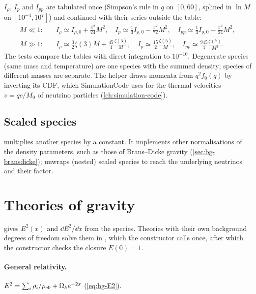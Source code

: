 \begin{implementation}
$I_\rho$, $I_p$ and $I_{pp}$ are tabulated once (Simpson's rule in $q$ on $[0,60]$, splined in $\ln M$ on
$[10^{-4},10^7]$) and continued with their series outside the table:
\begin{align*}
M\ll1:&\quad I_\rho\simeq I_{\rho,0}+\tfrac{\pi^2}{24}M^2,\quad I_p\simeq \tfrac13I_{\rho,0}-\tfrac{\pi^2}{72}M^2,
\quad I_{pp}\simeq\tfrac13I_{\rho,0}-\tfrac{\pi^2}{24}M^2,\\
M\gg1:&\quad I_\rho\simeq\tfrac32\zeta(3)M+\tfrac{45}{4}\frac{\zeta(5)}{M},\quad I_p\simeq\tfrac{15}{2}\frac{\zeta(5)}{M},
\quad I_{pp}\simeq\tfrac{945}{4}\frac{\zeta(7)}{M^3}.
\end{align*}
The tests compare the tables with direct integration to $10^{-10}$. Degenerate species (same mass and temperature)
are one species with the summed density; species of different masses are separate. The helper
 draws momenta from $q^2f_0(q)$ by inverting its CDF, which SimulationCode uses for the
thermal velocities $v=qc/M_0$ of neutrino particles (\cref{ch:simulation-code}).
\end{implementation}

\subsection{Scaled species}

 multiplies another species by a constant. It implements other normalisations of the density
parameters, such as those of Brans--Dicke gravity (\cref{sec:bg-bransdicke}); 
unwraps (nested) scaled species to reach the underlying neutrinos and their factor.

\section{Theories of gravity}\label{sec:bg-field-equations}

 gives $E^2(x)$ and $\dd E^2/\dd x$ from the species. Theories with their own background degrees
of freedom solve them in , which the  constructor calls once, after which the
constructor checks the closure $E(0)=1$.

\paragraph*{General relativity.} $E^2=\sum_i\rho_i/\rho_{c0}+\Omega_ke^{-2x}$ (\cref{eq:bg-E2}).

